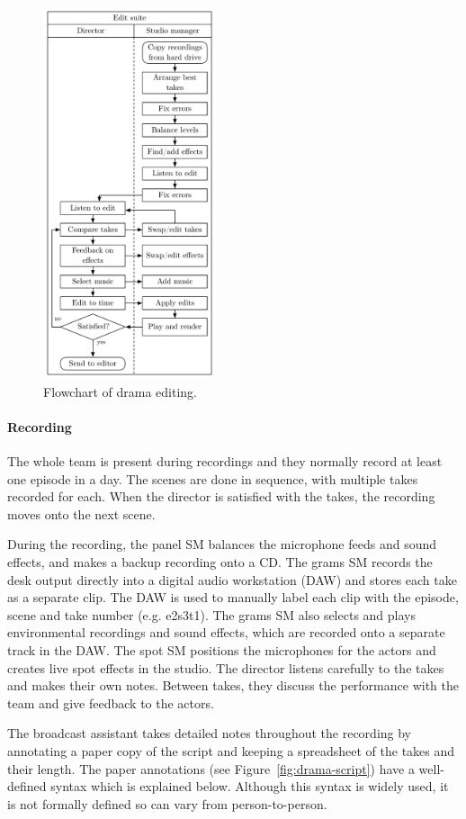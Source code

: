 \begin{figure}[ht]
  \centering
  \includegraphics[width=2in]{figs/drama-editing-workflow.pdf}
  \caption{Flowchart of drama editing.}
  \label{fig:ethno-drama-recording}
\end{figure}

\paragraph{Recording}
The whole team is present during recordings and they normally record at least one episode in a day. The scenes are done
in sequence, with multiple takes recorded for each. When the director is satisfied with the takes, the recording moves
onto the next scene.

During the recording, the panel SM balances the microphone feeds and sound effects, and makes a backup recording onto a
CD. The grams SM records the desk output directly into a digital audio workstation (DAW) and stores each take as a
separate clip. The DAW is used to manually label each clip with the episode, scene and take number (e.g. e2s3t1). The
grams SM also selects and plays environmental recordings and sound effects, which are recorded onto a separate track in
the DAW. The spot SM positions the microphones for the actors and creates live spot effects in the studio. The director
listens carefully to the takes and makes their own notes.  Between takes, they discuss the performance with the team
and give feedback to the actors.

The broadcast assistant takes detailed notes throughout the recording by annotating a paper copy of the script and
keeping a spreadsheet of the takes and their length. The paper annotations (see Figure~\ref{fig:drama-script}) have a
well-defined syntax which is explained below. Although this syntax is widely used, it is not formally defined so can
vary from person-to-person.

